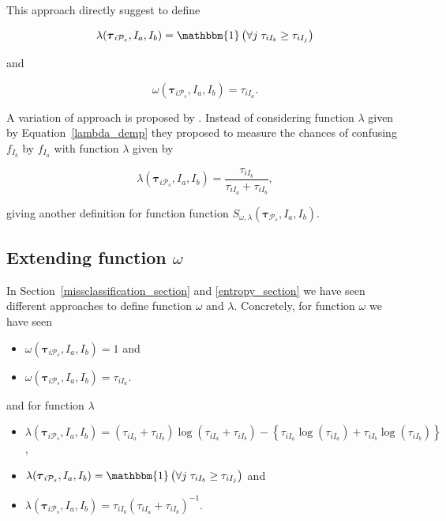 \documentclass[10pt, a4paper]{article}
\newcommand{\m}[1]{\boldsymbol{#1}}
\begin{document}
\begin{spacing}{1.9}
This approach directly suggest to define

\begin{equation}\label{lambda_demp}
\lambda(\m\tau_{i \mathcal{P}_s},  I_a,  I_b) = \mathbbm{1}\left( \forall j\; \tau_{i I_{b}} \geq \tau_{iI_j} \right)
\end{equation}

and

\[
\omega(\m\tau_{i \mathcal{P}_s},  I_a,  I_b) =  \tau_{iI_a}.
\]

A variation of \cite{hennig2010methods} approach is proposed by \cite{longford2014}. Instead of considering function $\lambda$ given by Equation~\ref{lambda_demp} they proposed to measure the chances of confusing $f_{I_b}$ by $f_{I_a}$ with function $\lambda$ given by

\[
\lambda(\m\tau_{i \mathcal{P}_s},  I_a,  I_b) = \frac{\tau_{iI_b}}{\tau_{iI_a} + \tau_{iI_b}},
\]

giving another definition for function function $S_{\omega, \lambda}( \m\tau_{\mathcal{P}_s},  I_a,  I_b)$.


\subsection{Extending function $\omega$}

In Section~\ref{missclassification_section} and \ref{entropy_section} we have seen different approaches to define function $\omega$ and $\lambda$. Concretely, for function $\omega$ we have seen

\begin{itemize}
\item $\omega(\m\tau_{i \mathcal{P}_s},  I_a,  I_b) = 1$ and
\item $\omega(\m\tau_{i \mathcal{P}_s},  I_a,  I_b) = \tau_{iI_a}$.
\end{itemize}

and for function $\lambda$ 

\begin{itemize}
\item $\lambda(\m\tau_{i \mathcal{P}_s},  I_a,  I_b) =  (\tau_{iI_a}+\tau_{iI_b}) \log(\tau_{iI_a} + \tau_{iI_b}) - \left\{ \tau_{iI_a} \log(\tau_{iI_a}) + \tau_{iI_b} \log(\tau_{iI_b}) \right\}$,
\item $\lambda(\m\tau_{i \mathcal{P}_s},  I_a,  I_b) = \mathbbm{1}\left( \forall j\; \tau_{i I_{b}} \geq \tau_{iI_j} \right)$ and
\item $\lambda(\m\tau_{i \mathcal{P}_s},  I_a,  I_b) = \tau_{iI_b} (\tau_{iI_a} + \tau_{iI_b})^{-1}$.
\end{itemize}


\end{spacing}
\end{document}

